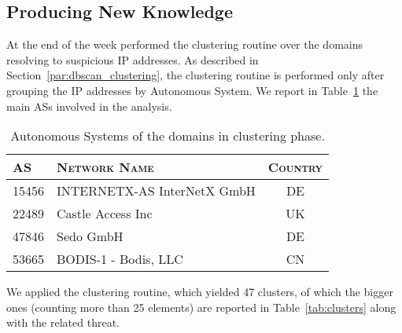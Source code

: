 \subsection{Producing New Knowledge} %
\label{sub:producing_new_knowledge}
At the end of the week \thesystem performed the clustering routine over
the domains resolving to suspicious IP addresses.  As described in
Section~\ref{par:dbscan_clustering}, the clustering routine is performed only
after grouping the IP addresses by Autonomous System. We report in
Table~\ref{tab:as} the main ASs involved in the analysis.
\begin{table}[!htp]
\centering
\begin{tabular}{lp{7cm}c}
\toprule
\textsc{AS} & \textsc{Network Name} & \textsc{Country} \\
\midrule
15456  & INTERNETX-AS InterNetX GmbH  & DE \\
22489  & Castle Access Inc            & UK \\
47846  & Sedo GmbH                    & DE \\
53665  & BODIS-1 - Bodis, LLC         & CN \\
\bottomrule
\end{tabular}
\caption{Autonomous Systems of the domains in clustering phase.}
\label{tab:as}
\end{table}
We applied the clustering routine, which yielded 47 clusters, of which the
bigger ones (counting more than 25 elements) are reported in Table~\ref{tab:clusters} along with the related threat.
